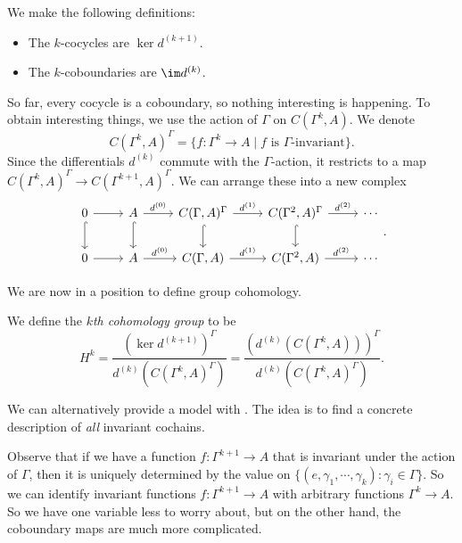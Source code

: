 \documentclass[a4paper]{article}
\begin{document}
We make the following definitions:
\begin{defi}\leavevmode
  \begin{itemize}
    \item The $k$-cocycles are $\ker d^{(k + 1)}$.
    \item The $k$-coboundaries are $\im d^{(k)}$.
  \end{itemize}
\end{defi}
So far, every cocycle is a coboundary, so nothing interesting is happening. To obtain interesting things, we use the action of $\Gamma$ on $C(\Gamma^k, A)$. We denote
\[
  C(\Gamma^k, A)^\Gamma = \{f: \Gamma^k \to A \mid f \text{ is $\Gamma$-invariant}\}.
\]
Since the differentials $d^{(k)}$ commute with the $\Gamma$-action, it restricts to a map $C(\Gamma^k, A)^\Gamma \to C(\Gamma^{k + 1}, A)^\Gamma$. We can arrange these into a new complex
\[
  \begin{tikzcd}
    0 \ar[r] \ar[d, hook] & A \ar[r, "d^{(0)}"] \ar[d, hook] & C(\Gamma, A)^\Gamma \ar[r, "d^{(1)}"] \ar[d, hook] & C(\Gamma^2, A)^\Gamma \ar[r, "d^{(2)}"]\ar[d, hook] & \cdots\\
    0 \ar[r] & A \ar[r, "d^{(0)}"] & C(\Gamma, A) \ar[r, "d^{(1)}"] & C(\Gamma^2, A) \ar[r, "d^{(2)}"] & \cdots
  \end{tikzcd}.
\]

We are now in a position to define group cohomology.
\begin{defi}
  We define the \emph{$k$th cohomology group} to be
  \[
    H^k = \frac{(\ker d^{(k + 1)})^\Gamma}{d^{(k)} (C(\Gamma^k, A)^\Gamma)} = \frac{(d^{(k)} (C(\Gamma^k, A)))^\Gamma}{d^{(k)} (C(\Gamma^k, A)^\Gamma)}.
  \]
\end{defi}

We can alternatively provide a model with . The idea is to find a concrete description of \emph{all} invariant cochains.

Observe that if we have a function $f: \Gamma^{k + 1} \to A$ that is invariant under the action of $\Gamma$, then it is uniquely determined by the value on $\{(e, \gamma_1, \cdots, \gamma_k): \gamma_i \in \Gamma\}$. So we can identify invariant functions $f: \Gamma^{k + 1} \to A$ with arbitrary functions $\Gamma^k \to A$. So we have one variable less to worry about, but on the other hand, the coboundary maps are much more complicated.
\end{document}
